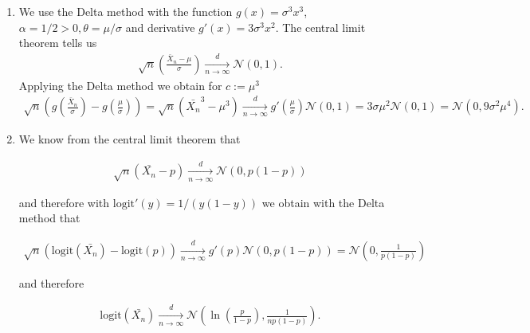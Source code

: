 \begin{solution}

\phantom{}

\begin{enumerate}[label = (\alph*)]
  \item We use the Delta method with the function
  $g(x) = \sigma^3x^3$, $\alpha = 1/2 > 0, \theta = \mu/\sigma$
  and derivative $g'(x) = 3\sigma^3x^2$.
  The central limit theorem tells us
  \begin{align*}
    \sqrt{n}\left(\frac{\bar{X}_n - \mu}{\sigma}\right) \xrightarrow[n \to \infty]{d} \mathcal{N}(0,1).
  \end{align*}
  Applying the Delta method we obtain for $c := \mu^3$
  \begin{align*}
    \sqrt{n}\left(g\left(\frac{\bar{X}_n}{\sigma}\right) - g\left(\frac{\mu}{\sigma}\right)\right)
    = \sqrt{n}(\bar{X_n}^3 - \mu^3) \xrightarrow[n \to \infty]{d} g'\left(\frac{\mu}{\sigma}\right)\mathcal{N}(0,1)
    = 3\sigma\mu^2\mathcal{N}(0,1) = \mathcal{N}(0, 9\sigma^2\mu^4).
  \end{align*}

  \item We know from the central limit theorem that

  \begin{align*}
    \sqrt{n}(\bar{X_n} - p) \xrightarrow[n \to \infty]{d} \mathcal{N}(0,p(1-p))
  \end{align*}

  and therefore with $\mathrm{logit}'(y) = 1/(y(1-y))$ we obtain with the Delta method that

  \begin{align*}
    \sqrt{n}(\mathrm{logit}(\bar{X_n}) - \mathrm{logit}(p)) \xrightarrow[n \to \infty]{d}
    g'(p)\mathcal{N}(0,p(1-p)) = \mathcal{N}\left(0,\frac{1}{p(1-p)}\right)
  \end{align*}

  and therefore

  \begin{align*}
    \mathrm{logit}(\bar{X_n}) \xrightarrow[n \to \infty]{d}
    \mathcal{N}\left(\ln\left(\frac{p}{1-p}\right),\frac{1}{np(1-p)}\right).
  \end{align*}

\end{enumerate}


\end{solution}

